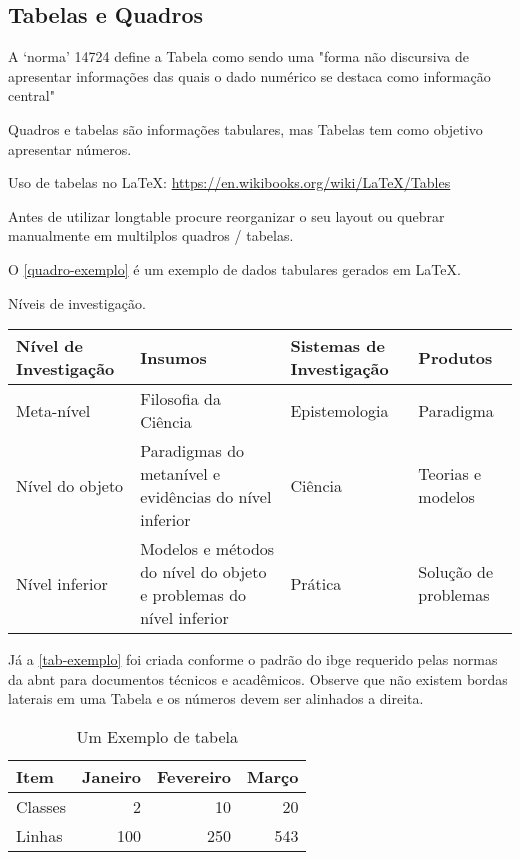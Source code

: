 \subsection{Tabelas e Quadros}
A ‘norma’ 14724 \cite[3.32]{NBR14724:2011} define a Tabela como sendo uma "forma não discursiva de apresentar informações das quais o dado numérico se destaca como informação central" 

Quadros e tabelas são informações tabulares, mas Tabelas tem como objetivo apresentar números.

Uso de tabelas no \LaTeX : \url{https://en.wikibooks.org/wiki/LaTeX/Tables}

Antes de utilizar longtable procure reorganizar o seu layout ou quebrar manualmente em multilplos quadros / tabelas.



O \autoref{quadro-exemplo} é um exemplo de dados tabulares gerados em 
\LaTeX.

\begin{quadro}[htb]
\centering
\ABNTEXfontereduzida
\caption[Níveis de investigação]{Níveis de investigação.}
\label{quadro-exemplo}
\begin{tabular}{|p{2.6cm}|p{6.0cm}|p{2.25cm}|p{3.40cm}|}
  \hline
   \textbf{Nível de Investigação} & \textbf{Insumos}  & \textbf{Sistemas de Investigação}  & \textbf{Produtos}  \\
    \hline
    Meta-nível & Filosofia\index{filosofia} da Ciência  & Epistemologia &
    Paradigma  \\
    \hline
    Nível do objeto & Paradigmas do metanível e evidências do nível inferior &
    Ciência  & Teorias e modelos \\
    \hline
    Nível inferior & Modelos e métodos do nível do objeto e problemas do nível inferior & Prática & Solução de problemas  \\
   \hline
\end{tabular}
\end{quadro}



Já a \autoref{tab-exemplo} foi criada conforme o padrão do \ac{ibge}
requerido pelas normas da \ac{abnt} para documentos técnicos e acadêmicos. Observe que não existem bordas laterais em uma Tabela e os números devem ser alinhados a direita.

\begin{table}[htb]
\centering
\caption{Um Exemplo de tabela}
\label{tab-exemplo}
\begin{tabular}{p{2.6cm}|r|r|r}
    \hline
   \textbf{Item} & \textbf{Janeiro}  & \textbf{Fevereiro}  & \textbf{Março}  \\
    \hline
    Classes & 2  & 10 & 20  \\
    \hline
    Linhas & 100  & 250 & 543 \\
    \hline
\end{tabular}
\end{table}

